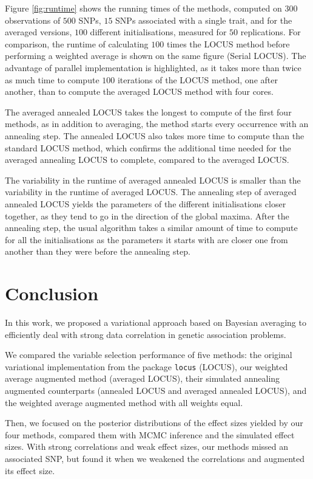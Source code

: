 \documentclass[a4paper, 11pt]{report}
\numberwithin{equation}{chapter}
\begin{document}
Figure \ref{fig:runtime} shows the running times of the methods, computed on $300$ observations of $500$ SNPs, $15$ SNPs associated with a single trait, and for the averaged versions, $100$ different initialisations, measured for $50$ replications. For comparison, the runtime of calculating $100$ times the LOCUS method before performing a weighted average is shown on the same figure (Serial LOCUS). The advantage of parallel implementation is highlighted, as it takes more than twice as much time to compute $100$ iterations of the LOCUS method, one after another, than to compute the averaged LOCUS method with four cores.

The averaged annealed LOCUS takes the longest to compute of the first four methods, as in addition to averaging, the method starts every occurrence with an annealing step. The annealed LOCUS also takes more time to compute than the standard LOCUS method, which confirms the additional time needed for the averaged annealing LOCUS to complete, compared to the averaged LOCUS.

The variability in the runtime of averaged annealed LOCUS is smaller than the variability in the runtime of averaged LOCUS. The annealing step of averaged annealed LOCUS yields the parameters of the different initialisations closer together, as they tend to go in the direction of the global maxima. After the annealing step, the usual algorithm takes a similar amount of time to compute for all the initialisations as the parameters it starts with are closer one from another than they were before the annealing step.
%
%
%
%
%
%
\newpage
\chapter{Conclusion}
In this work, we proposed a variational approach based on Bayesian averaging to efficiently deal with strong data correlation in genetic association problems.

We compared the variable selection performance of five methods: the original variational implementation from the package \texttt{locus} (LOCUS), our weighted average augmented method (averaged LOCUS), their simulated annealing augmented counterparts (annealed LOCUS and averaged annealed LOCUS), and the weighted average augmented method with all weights equal.

Then, we focused on the posterior distributions of the effect sizes yielded by our four methods, compared them with MCMC inference and the simulated effect sizes. With strong correlations and weak effect sizes, our methods missed an associated SNP, but found it when we weakened the correlations and augmented its effect size.
\end{document}
